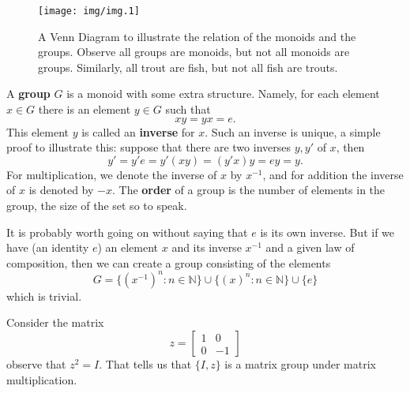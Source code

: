 
\begin{figure}[ht!]
\begin{center}
\texttt{[image: img/img.1]}
\end{center}
\caption[Relation between Monoids and Groups]{A Venn Diagram
  to illustrate the relation of the monoids and the
  groups. Observe all groups are monoids, but not all
  monoids are groups. Similarly, all trout are fish, but not
  all fish are trouts.}
\end{figure}
A \textbf{group} $G$ is a monoid with some
extra structure. Namely, for each element $x\in G$ there is
an element $y\in G$ such that
\begin{equation}
xy = yx = e.
\end{equation}
This element $y$ is called an
\textbf{inverse} for $x$. Such an inverse is
unique, a simple proof to illustrate this: suppose that
there are two inverses $y,y'$ of $x$, then
\begin{equation}
y' = y'e = y'(xy) = (y'x)y = ey = y.
\end{equation}
For multiplication, we denote the inverse of $x$ by
$x^{-1}$, and for addition the inverse of $x$ is denoted by
$-x$. The \textbf{order} of a group is
the number of elements in the group, the size of the set so
to speak.

It is probably worth going on without saying that $e$ is its
own inverse. But if we have (an identity $e$) an element $x$ and its inverse
$x^{-1}$ and a given law of composition, then we can create
a group consisting of the elements
\begin{equation}
G = \{ (x^{-1})^{n}:n\in\mathbb{N}\}\cup\{(x)^{n}:n\in\mathbb{N}\}\cup\{e\}
\end{equation}
which is trivial. 

\begin{ex}
Consider the matrix
\begin{equation}
z = \begin{bmatrix}1 & 0 \\0 & -1\end{bmatrix}
\end{equation}
observe that $z^2=I$. That tells us that $\{I,z\}$ is a
matrix group under matrix multiplication. \qef
\end{ex}

